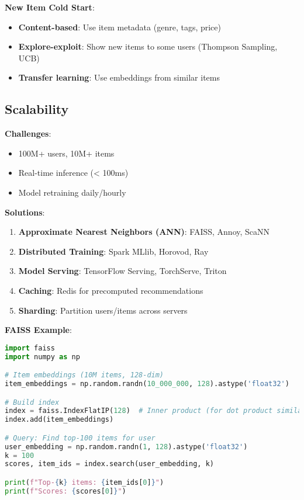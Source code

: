 \documentclass[10pt]{article}
\begin{document}
\textbf{New Item Cold Start}:
\begin{itemize}[leftmargin=*]
    \item \textbf{Content-based}: Use item metadata (genre, tags, price)
    \item \textbf{Explore-exploit}: Show new items to some users (Thompson Sampling, UCB)
    \item \textbf{Transfer learning}: Use embeddings from similar items
\end{itemize}

\subsection{Scalability}

\textbf{Challenges}:
\begin{itemize}[leftmargin=*]
    \item 100M+ users, 10M+ items
    \item Real-time inference (< 100ms)
    \item Model retraining daily/hourly
\end{itemize}

\textbf{Solutions}:
\begin{enumerate}[leftmargin=*]
    \item \textbf{Approximate Nearest Neighbors (ANN)}: FAISS, Annoy, ScaNN
    \item \textbf{Distributed Training}: Spark MLlib, Horovod, Ray
    \item \textbf{Model Serving}: TensorFlow Serving, TorchServe, Triton
    \item \textbf{Caching}: Redis for precomputed recommendations
    \item \textbf{Sharding}: Partition users/items across servers
\end{enumerate}

\textbf{FAISS Example}:
\begin{lstlisting}[language=Python]
import faiss
import numpy as np

# Item embeddings (10M items, 128-dim)
item_embeddings = np.random.randn(10_000_000, 128).astype('float32')

# Build index
index = faiss.IndexFlatIP(128)  # Inner product (for dot product similarity)
index.add(item_embeddings)

# Query: Find top-100 items for user
user_embedding = np.random.randn(1, 128).astype('float32')
k = 100
scores, item_ids = index.search(user_embedding, k)

print(f"Top-{k} items: {item_ids[0]}")
print(f"Scores: {scores[0]}")
\end{lstlisting}
\end{document}
